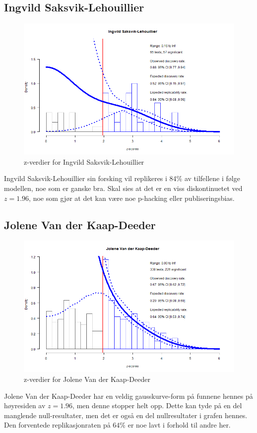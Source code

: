 \documentclass[doc,norsk]{apa7}
\begin{document}
\subsection{Ingvild Saksvik-Lehouillier}
\begin{figure}[h!]
    \centering
    \includegraphics[width=\textwidth]{images/Ingvild Saksvik-Lehouillier.png}
    \caption{z-verdier for Ingvild Saksvik-Lehouillier}
\end{figure}
Ingvild Saksvik-Lehouillier sin forsking vil replikeres i 84\% av tilfellene i følge modellen, noe som er ganske bra. Skal sies at det er en viss diskontinuetet ved $z=1.96$, noe som gjør at det kan være noe p-hacking eller publiseringsbias.

\subsection{Jolene Van der Kaap-Deeder}
\begin{figure}[h!]
    \centering
    \includegraphics[width=\textwidth]{images/Jolene Van der Kaap-Deeder.png}
    \caption{z-verdier for Jolene Van der Kaap-Deeder}
\end{figure}
Jolene Van der Kaap-Deeder har en veldig gausskurve-form på funnene hennes på høyresiden av $z=1.96$, men denne stopper helt opp. Dette kan tyde på en del manglende null-resultater, men det er også en del nullresultater i grafen hennes. Den forventede replikasjonraten på $64\%$ er noe lavt i forhold til andre her.
\end{document}
